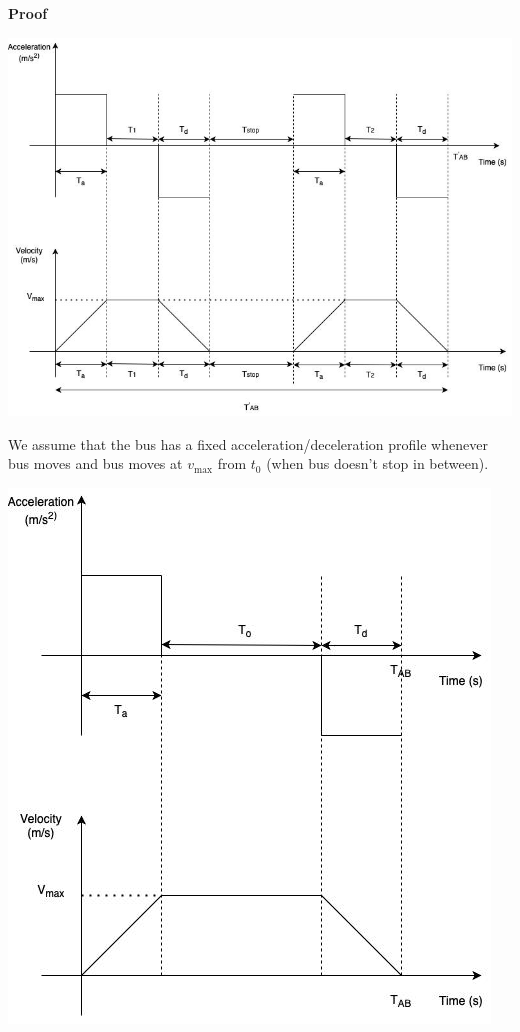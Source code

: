 \noindent\textbf{Proof}
\begin{center}
    \includegraphics[scale = 0.5]{Files/Images/Img2.jpeg}
\end{center}
We assume that the bus has a fixed acceleration/deceleration profile whenever bus moves and bus moves at $v_{\max}$ from $t_0$ (when bus doesn't stop in between).
\begin{center}
    \includegraphics[scale = 0.5]{Files/Images/Img3.jpeg}
\end{center}

